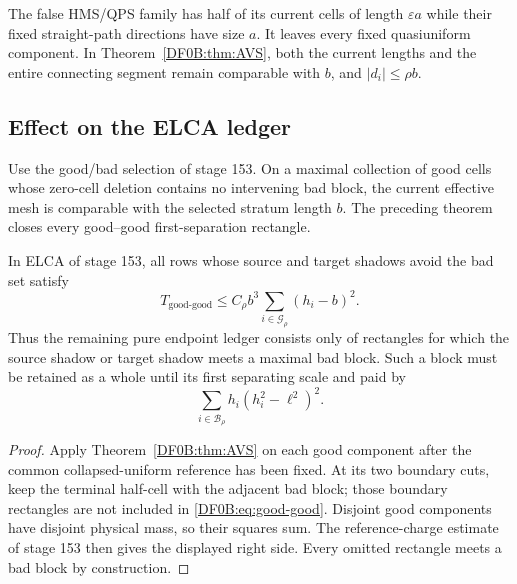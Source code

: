 \begin{remark}
The false HMS/QPS family has half of its current cells of length
$\varepsilon a$ while their fixed straight-path directions have size
$a$.  It leaves every fixed quasiuniform component.  In
Theorem~\ref{DF0B:thm:AVS}, both the current lengths and the entire connecting
segment remain comparable with $b$, and $|d_i|\le\rho b$.
\end{remark}

\subsection{Effect on the ELCA ledger}

Use the good/bad selection of stage 153.  On a maximal collection of
good cells whose zero-cell deletion contains no intervening bad block,
the current effective mesh is comparable with the selected stratum
length $b$.  The preceding theorem closes every good--good
first-separation rectangle.

\begin{corollary}
\label{DF0B:cor:remaining}
In ELCA of stage 153, all rows whose source and target shadows avoid the
bad set satisfy
\begin{equation}\label{DF0B:eq:good-good}
 T_{\mathrm{good\text{-}good}}
 \le C_\rho b^3\sum_{i\in\mathcal G_\rho}(h_i-b)^2.
\end{equation}
Thus the remaining pure endpoint ledger consists only of rectangles for
which the source shadow or target shadow meets a maximal bad block.  Such
a block must be retained as a whole until its first separating scale and
paid by
\begin{equation}\label{DF0B:eq:bad-charge}
 \sum_{i\in\mathcal B_\rho}h_i(h_i^2-\ell^2)^2.
\end{equation}
\end{corollary}

\begin{proof}
Apply Theorem~\ref{DF0B:thm:AVS} on each good component after the common
collapsed-uniform reference has been fixed.  At its two boundary cuts,
keep the terminal half-cell with the adjacent bad block; those boundary
rectangles are not included in \eqref{DF0B:eq:good-good}.  Disjoint good
components have disjoint physical mass, so their squares sum.  The
reference-charge estimate of stage 153 then gives the displayed right
side.  Every omitted rectangle meets a bad block by construction.
\end{proof}
\endgroup
